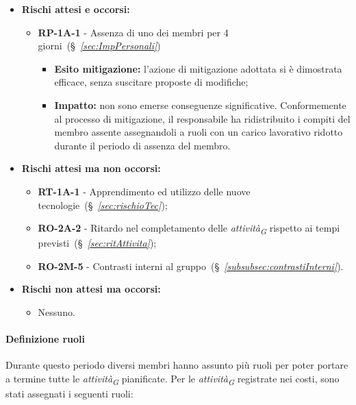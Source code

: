 \begin{itemize}
    \item \textbf{Rischi attesi e occorsi:}
\begin{itemize}
    \item \textbf{RP-1A-1} - Assenza di uno dei membri per 4 giorni~(\S~\textit{\ref{sec:ImpPersonali}})
    \begin{itemize}
        \item \textbf{Esito mitigazione:} 
        l'azione di mitigazione adottata si è dimostrata efficace, senza suscitare proposte di modifiche;
        \item \textbf{Impatto:}
        non sono emerse conseguenze significative. Conformemente al processo di mitigazione, il responsabile ha ridistribuito i compiti del membro assente assegnandoli a ruoli con un carico lavorativo ridotto durante il periodo di assenza del membro.
    \end{itemize}
\end{itemize}
\item \textbf{Rischi attesi ma non occorsi:}
 \begin{itemize}
    \item \textbf{RT-1A-1} - Apprendimento ed utilizzo delle nuove tecnologie~(\S~\textit{\ref{sec:rischioTec}});
    \item \textbf{RO-2A-2} - Ritardo nel completamento delle \textit{attività}\textsubscript{\textit{G}} rispetto ai tempi previsti~(\S~\textit{\ref{sec:ritAttivita}});
    \item \textbf{RO-2M-5} - Contrasti interni al gruppo~(\S~\textit{\ref{subsubsec:contrastiInterni}}).
\end{itemize}
\item \textbf{Rischi non attesi ma occorsi:}
\begin{itemize}
    \item Nessuno.
\end{itemize}
\end{itemize}

\pagebreak

\paragraph{Definizione ruoli}
Durante questo periodo diversi membri hanno assunto più ruoli per poter portare a termine tutte le \textit{attività}\textsubscript{\textit{G}} pianificate.
Per le \textit{attività}\textsubscript{\textit{G}} registrate nei costi, sono stati assegnati i seguenti ruoli:

